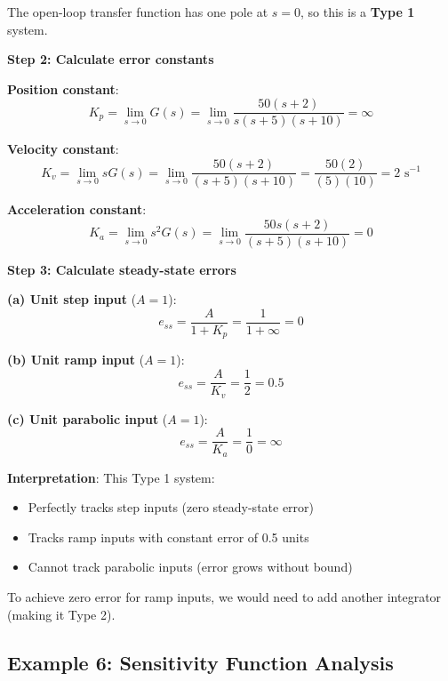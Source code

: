 The open-loop transfer function has one pole at $s = 0$, so this is a \textbf{Type 1} system.

\textbf{Step 2: Calculate error constants}

\textbf{Position constant}:
\begin{equation}
    K_p = \lim_{s \to 0} G(s) = \lim_{s \to 0} \frac{50(s+2)}{s(s+5)(s+10)} = \infty
\end{equation}

\textbf{Velocity constant}:
\begin{equation}
    K_v = \lim_{s \to 0} sG(s) = \lim_{s \to 0} \frac{50(s+2)}{(s+5)(s+10)} = \frac{50(2)}{(5)(10)} = 2 \text{ s}^{-1}
\end{equation}

\textbf{Acceleration constant}:
\begin{equation}
    K_a = \lim_{s \to 0} s^2 G(s) = \lim_{s \to 0} \frac{50s(s+2)}{(s+5)(s+10)} = 0
\end{equation}

\textbf{Step 3: Calculate steady-state errors}

\textbf{(a) Unit step input} ($A = 1$):
\begin{equation}
    e_{ss} = \frac{A}{1 + K_p} = \frac{1}{1 + \infty} = \boxed{0}
\end{equation}

\textbf{(b) Unit ramp input} ($A = 1$):
\begin{equation}
    e_{ss} = \frac{A}{K_v} = \frac{1}{2} = \boxed{0.5}
\end{equation}

\textbf{(c) Unit parabolic input} ($A = 1$):
\begin{equation}
    e_{ss} = \frac{A}{K_a} = \frac{1}{0} = \boxed{\infty}
\end{equation}

\textbf{Interpretation}: This Type 1 system:
\begin{itemize}
    \item Perfectly tracks step inputs (zero steady-state error)
    \item Tracks ramp inputs with constant error of 0.5 units
    \item Cannot track parabolic inputs (error grows without bound)
\end{itemize}

To achieve zero error for ramp inputs, we would need to add another integrator (making it Type 2).

\subsection{Example 6: Sensitivity Function Analysis}

